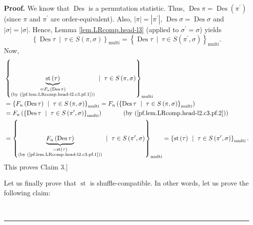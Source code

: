 \documentclass[numbers=enddot,12pt,final,onecolumn,notitlepage]{scrartcl}%
\theoremstyle{definition}
\newenvironment{proof}[1][Proof]{\noindent\textbf{#1.} }{\ \rule{0.5em}{0.5em}}
\begin{document}
\begin{proof}
We know that $\operatorname*{Des}$ is a permutation statistic. Thus,
$\operatorname*{Des}\pi=\operatorname*{Des}\left(  \pi^{\prime}\right)  $
(since $\pi$ and $\pi^{\prime}$ are order-equivalent). Also, $\left\vert
\pi\right\vert =\left\vert \pi^{\prime}\right\vert $, $\operatorname*{Des}%
\sigma=\operatorname*{Des}\sigma$ and $\left\vert \sigma\right\vert
=\left\vert \sigma\right\vert $. Hence, Lemma \ref{lem.LRcomp.head-l3}
(applied to $\sigma^{\prime}=\sigma$) yields
\begin{equation}
\left\{  \operatorname*{Des}\tau\ \mid\ \tau\in S\left(  \pi,\sigma\right)
\right\}  _{\operatorname*{multi}}=\left\{  \operatorname*{Des}\tau
\ \mid\ \tau\in S\left(  \pi^{\prime},\sigma\right)  \right\}
_{\operatorname*{multi}}. \label{pf.lem.LRcomp.head-l2.c3.pf.2}%
\end{equation}
Now,
\begin{align*}
&  \left\{  \underbrace{\operatorname*{st}\left(  \tau\right)  }%
_{\substack{=F_{n}\left(  \operatorname*{Des}\tau\right)  \\\text{(by
(\ref{pf.lem.LRcomp.head-l2.c3.pf.1}))}}}\ \mid\ \tau\in S\left(  \pi
,\sigma\right)  \right\}  _{\operatorname*{multi}}\\
&  =\left\{  F_{n}\left(  \operatorname*{Des}\tau\right)  \ \mid\ \tau\in
S\left(  \pi,\sigma\right)  \right\}  _{\operatorname*{multi}}=F_{n}\left(
\left\{  \operatorname*{Des}\tau\ \mid\ \tau\in S\left(  \pi,\sigma\right)
\right\}  _{\operatorname*{multi}}\right) \\
&  =F_{n}\left(  \left\{  \operatorname*{Des}\tau\ \mid\ \tau\in S\left(
\pi^{\prime},\sigma\right)  \right\}  _{\operatorname*{multi}}\right)
\ \ \ \ \ \ \ \ \ \ \left(  \text{by (\ref{pf.lem.LRcomp.head-l2.c3.pf.2}%
)}\right) \\
&  =\left\{  \underbrace{F_{n}\left(  \operatorname*{Des}\tau\right)
}_{\substack{=\operatorname*{st}\left(  \tau\right)  \\\text{(by
(\ref{pf.lem.LRcomp.head-l2.c3.pf.1}))}}}\ \mid\ \tau\in S\left(  \pi^{\prime
},\sigma\right)  \right\}  _{\operatorname*{multi}}=\left\{
\operatorname*{st}\left(  \tau\right)  \ \mid\ \tau\in S\left(  \pi^{\prime
},\sigma\right)  \right\}  _{\operatorname*{multi}}.
\end{align*}
This proves Claim 3.]

Let us finally prove that $\operatorname*{st}$ is shuffle-compatible. In other
words, let us prove the following claim:


\end{proof}
\end{document}
